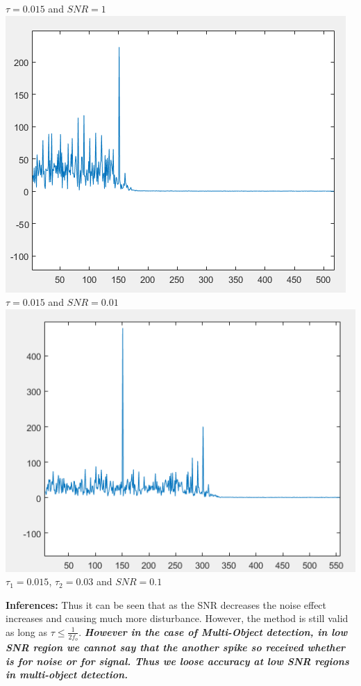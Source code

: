 \documentclass[12pt]{article}
\begin{document}
\begin{center}
     $\tau= 0.015$ and $SNR=1$\\
     \includegraphics[scale = 0.75]{n++.PNG}\\[1.0 cm]
     $\tau= 0.015$ and $SNR=0.01$\\
     \includegraphics[scale = 0.75]{mulnoise.PNG}\\[1.0 cm]
     $\tau_1= 0.015$, $\tau_2= 0.03$ and $SNR=0.1$\\
\end{center}
\textbf{Inferences:}
Thus it can be seen that as the SNR decreases the noise effect increases and causing much more disturbance. However, the method is still valid as long as $\tau \leq \frac{1}{2f_o}$.\textit{ \textbf{However in the case of Multi-Object detection, in low SNR region we cannot say that the another spike so received whether is for noise or for signal. Thus we loose accuracy at low SNR regions in multi-object detection.}}
\end{document}
